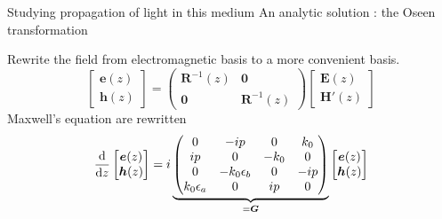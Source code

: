 \documentclass[aspectratio=169]{beamer}
\begin{document}
\begin{frame}{Studying propagation of light in this medium}
An analytic solution : the Oseen transformation
\pause

Rewrite the field from electromagnetic basis to a more convenient basis.
\begin{equation*}
\begin{bmatrix}
\bm{e}(z)\\\bm{h}(z)
\end{bmatrix} = \begin{pmatrix}
\bm{R}^{-1}(z) & \bm{0}\\
\bm{0} & \bm{R}^{-1}(z)
\end{pmatrix}\begin{bmatrix}
\bm{E}(z)\\\bm{H}'(z)
\end{bmatrix}
\end{equation*}
\pause
Maxwell's equation are rewritten
\begin{equation*}
\dv{z}\begin{bmatrix}
\bm{e}(z)\\\bm{h}(z)
\end{bmatrix}=i\underbrace{\begin{pmatrix}
	0 & -ip & 0 & k_0\\
	ip & 0 & -k_0 & 0\\
	0 & -k_0\epsilon_b & 0 & -ip\\
	k_0\epsilon_a & 0 & ip & 0\\
	\end{pmatrix}}_{=\bm{G}}\begin{bmatrix}
\bm{e}(z)\\\bm{h}(z)
\end{bmatrix}
\end{equation*}
\end{frame}
\end{document}
